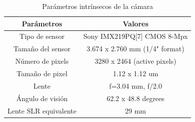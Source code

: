 \begin{table}[H]
\begin{center}
\begin{tabular}{|c|c|}
\hline
\textbf{Parámetros} & \textbf{Valores} \\
\hline
Tipo de sensor & Sony IMX219PQ[7] CMOS 8-Mpx \\
Tamaño del sensor & 3.674 x 2.760 mm (1/4" format) \\
Número de pixels & 3280 x 2464 (active pixels) \\
Tamaño de pixel & 1.12 x 1.12 um \\
Lente & f=3.04 mm, f/2.0 \\
Ángulo de visión & 62.2 x 48.8 degrees \\
Lente SLR equivalente & 29 mm \\
\hline
\end{tabular}
\caption{Parámetros intrínsecos de la cámara}
\label{cuadro:ejemplo}
\end{center}
\end{table}

